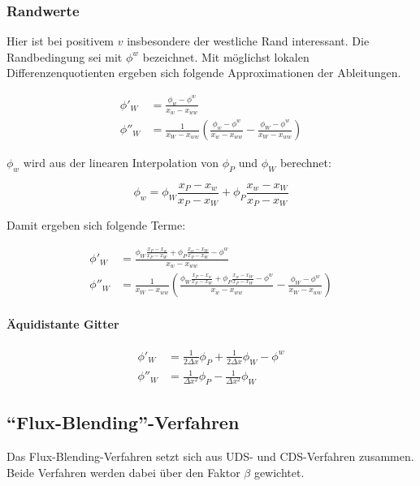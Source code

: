 \documentclass[11pt, ngerman,colorback,accentcolor=tud2d]{tudreport}
\begin{document}
\subsubsection{Randwerte}

Hier ist bei positivem $v$ insbesondere der westliche Rand interessant. Die
Randbedingung sei mit $\phi^w$ bezeichnet. Mit möglichst lokalen Differenzenquotienten
ergeben sich folgende Approximationen der Ableitungen.

\begin{align*}
  \phi'_W &= \frac{\phi_w-\phi^w}{x_w-x_{ww}}\\
  \phi''_W &= \frac{1}{x_W-x_{ww}} \left({\frac{\phi_w-\phi^w}{x_w-x_{ww}}
- \frac{\phi_W-\phi^w}{x_W-x_{ww}} }\right)
\end{align*}

$\phi_w$ wird aus der linearen Interpolation von $\phi_P$ und $\phi_W$ berechnet:

\begin{equation*}
  \phi_w = \phi_W \frac{x_P-x_w}{x_P-x_W} + \phi_P \frac{x_w-x_W}{x_P-x_W}
\end{equation*}

Damit ergeben sich folgende Terme:

\begin{align}
  \phi'_W &= \frac{\phi_W \frac{x_P-x_w}{x_P-x_W} + \phi_P \frac{x_w-x_W}{x_P-x_W}
-\phi^w}{x_w-x_{ww}}\\
  \phi''_W &= \frac{1}{x_W-x_{ww}} \left({\frac{\phi_W \frac{x_P-x_w}{x_P-x_W} + \phi_P \frac{x_w-x_W}{x_P-x_W}
-\phi^w}{x_w-x_{ww}}
- \frac{\phi_W-\phi^w}{x_W-x_{ww}} }\right)
\end{align}


\paragraph{Äquidistante Gitter}

\begin{align*}
  \phi'_W  &= \frac{1}{2\Delta x} \phi_P + \frac{1}{2\Delta x} \phi_W - \phi^w\\
  \phi''_W &= \frac{1}{\Delta x^2} \phi_P -\frac{1}{\Delta x^2} \phi_W
\end{align*}


\subsection{``Flux-Blending''-Verfahren}

Das Flux-Blending-Verfahren setzt sich aus UDS- und CDS-Verfahren zusammen. Beide
Verfahren werden dabei über den Faktor $\beta$ gewichtet.
\end{document}
